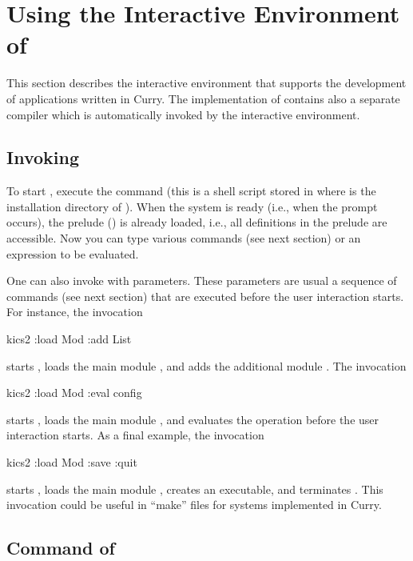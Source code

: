 \section{Using the Interactive Environment of \CYS}
\label{sec-kics2}

This section describes the interactive environment
\CYS\index{\CYS}
that supports the development of applications written in Curry.
The implementation of \CYS contains also a separate compiler
which is automatically invoked by the interactive environment.

\subsection{Invoking \CYS}
\label{sec:invoke-kics2}

To start \CYS, execute the command
(this is a shell script stored in
 where \cyshome is the installation directory
of \CYS).
When the system is ready (i.e., when the prompt  occurs),
the prelude ()
is already loaded, i.e., all definitions in the prelude are accessible.
Now you can type various commands (see next section)
or an expression to be evaluated.

One can also invoke \CYS with parameters.
These parameters are usual a sequence of commands
(see next section) that are executed before the user interaction
starts. For instance, the invocation
\begin{curry}
kics2 :load Mod :add List
\end{curry}
starts \CYS, loads the main module , and adds the additional
module .
The invocation
\begin{curry}
kics2 :load Mod :eval config
\end{curry}
starts \CYS, loads the main module , and evaluates
the operation  before the user interaction starts.
As a final example, the invocation
\begin{curry}
kics2 :load Mod :save :quit
\end{curry}
starts \CYS, loads the main module , creates an executable,
and terminates \CYS. This invocation could be useful in ``make'' files
for systems implemented in Curry.


\subsection{Command of \CYS}
\label{sec:kics2-commands}


